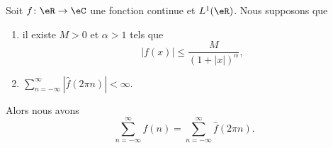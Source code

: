 \begin{proposition}   \label{ProprPbkoQ}
    Soit \( f\colon \eR\to \eC\) une fonction continue et \( L^1(\eR)\). Nous supposons que
    \begin{enumerate}
        \item
    il existe \( M>0\) et \( \alpha>1\) tels que
    \begin{equation}
        | f(x) |\leq\frac{ M }{ (1+| x |)^{\alpha} },
    \end{equation}
        \item
            \( \sum_{n=-\infty}^{\infty}| \hat f(2\pi n) |<\infty\).

    \end{enumerate}
    Alors nous avons
    \begin{equation}
        \sum_{n=-\infty}^{\infty}f(n)=\sum_{n=-\infty}^{\infty}\hat f(2\pi n).
    \end{equation}
\end{proposition}


